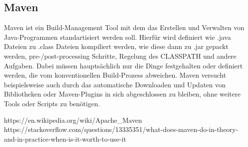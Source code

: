 \subsection{Maven}
Maven ist ein Build-Management Tool mit dem das Erstellen und Verwalten von Java-Programmen  
standartisiert werden soll. Hierfür wird definiert wie .java Dateien zu .class Dateien 
kompiliert werden, wie diese dann zu .jar gepackt werden, pre-/post-processing Schritte, 
Regelung des CLASSPATH und andere Aufgaben. Dabei müssen hauptsächlich nur die Dinge
festgehalten oder definiert werden, die vom konventionellen Build-Prozess abweichen. 
Maven versucht beispielsweise auch durch das automatische Downloaden und Updaten von 
Bibliotheken oder Maven-Plugins in sich abgeschlossen zu bleiben, ohne weitere Tools 
oder Scripts zu benötigen.

https://en.wikipedia.org/wiki/Apache_Maven
https://stackoverflow.com/questions/13335351/what-does-maven-do-in-theory-and-in-practice-when-is-it-worth-to-use-it
